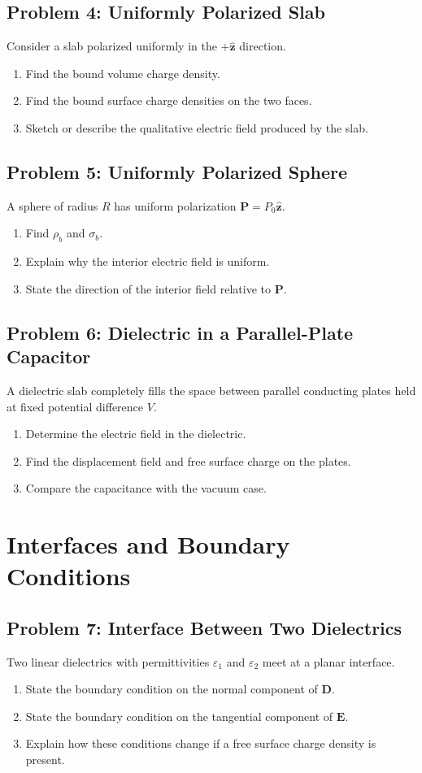 \documentclass[hidelinks]{article}
\begin{document}
\subsection{Problem 4: Uniformly Polarized Slab}
Consider a slab polarized uniformly in the $+\hat{\mathbf{z}}$ direction.
\begin{enumerate}[label=\alph*)]
\item Find the bound volume charge density.
\item Find the bound surface charge densities on the two faces.
\item Sketch or describe the qualitative electric field produced by the slab.
\end{enumerate}

\subsection{Problem 5: Uniformly Polarized Sphere}
A sphere of radius $R$ has uniform polarization $\mathbf{P}=P_0\hat{\mathbf{z}}$.
\begin{enumerate}[label=\alph*)]
\item Find $\rho_b$ and $\sigma_b$.
\item Explain why the interior electric field is uniform.
\item State the direction of the interior field relative to $\mathbf{P}$.
\end{enumerate}

\subsection{Problem 6: Dielectric in a Parallel-Plate Capacitor}
A dielectric slab completely fills the space between parallel conducting plates held at fixed potential difference $V$.
\begin{enumerate}[label=\alph*)]
\item Determine the electric field in the dielectric.
\item Find the displacement field and free surface charge on the plates.
\item Compare the capacitance with the vacuum case.
\end{enumerate}

\section{Interfaces and Boundary Conditions}
\subsection{Problem 7: Interface Between Two Dielectrics}
Two linear dielectrics with permittivities $\varepsilon_1$ and $\varepsilon_2$ meet at a planar interface.
\begin{enumerate}[label=\alph*)]
\item State the boundary condition on the normal component of $\mathbf{D}$.
\item State the boundary condition on the tangential component of $\mathbf{E}$.
\item Explain how these conditions change if a free surface charge density is present.
\end{enumerate}
\end{document}
